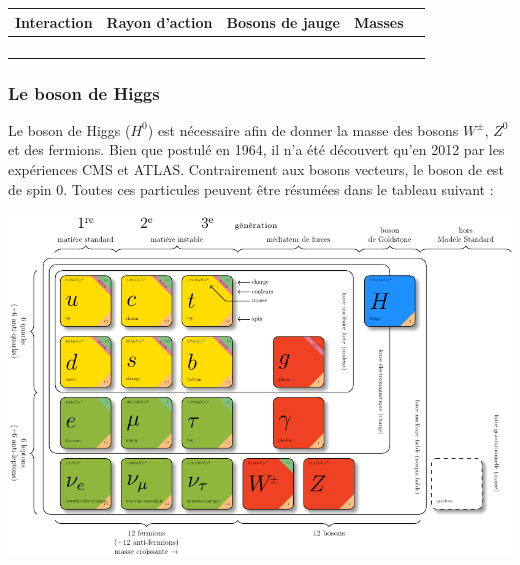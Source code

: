\vspace{1cm}
\begin{table}[ht!]
	\centering
	\begin{tabular}{|O|O|O|O|N}
		\hline 
		Interaction&Rayon d'action&Bosons de jauge&Masses\\
		\hline 
		&
		& 
		&
		\\
		\hline 
		&
		\shortstack{ $\infty$}& 
		&
		\\
		\hline 
		&
		& 
		&
		\\
		\hline 
		&
		\shortstack{$\infty$}& 
		&
		\\
		\hline 
\end{tabular} 
\label{bosons}
\end{table}

\subsubsection{Le boson de Higgs}
Le boson de Higgs ($H^{0}$) est nécessaire afin de donner la masse des bosons $W^{\pm}$, $Z^{0}$ et des fermions. Bien que postulé en \num{1964}, il n'a été découvert qu'en \num{2012} par les expériences CMS et ATLAS. Contrairement aux bosons vecteurs, le boson de  est de spin \num{0}.
\newpage
Toutes ces particules peuvent être résumées dans le tableau suivant : 

\begin{minipagewithmarginpars}[h]{\textwidth}
	\vspace{-0.5cm}
	\centering
	\hspace*{-1.5cm}
	\includegraphics[scale=1]{SM/bestiaire.pdf}
	\label{bestiaire}
\end{minipagewithmarginpars}
